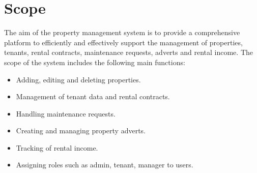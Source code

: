 \section{Scope}

The aim of the property management system is to provide a comprehensive platform to efficiently and effectively support the management of properties, tenants, rental contracts, maintenance requests,  adverts and rental income. The scope of the system includes the following main functions:
\begin{itemize}
\item	Adding, editing and deleting properties. 
\item	Management of tenant data and rental contracts.
\item   Handling maintenance requests.
\item   Creating and managing property adverts.
\item   Tracking of rental income.
\item   Assigning roles such as admin, tenant, manager to users.
\end{itemize}

